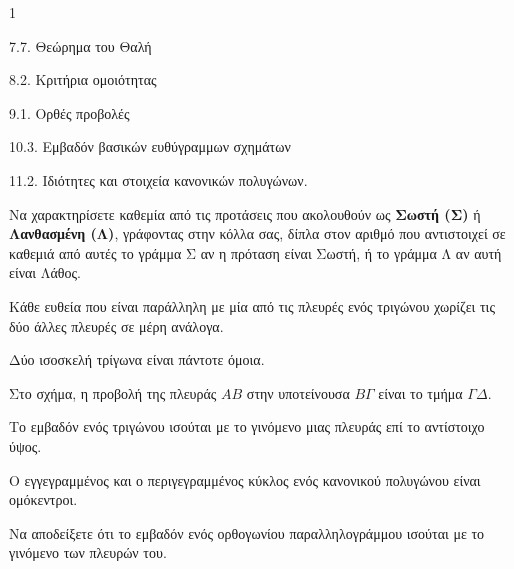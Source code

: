\begin{ylh}{1}
    \item 7.7. Θεώρημα του Θαλή
    \item 8.2. Κριτήρια ομοιότητας
    \item 9.1. Ορθές προβολές
    \item 10.3. Εμβαδόν βασικών ευθύγραμμων σχημάτων
    \item 11.2. Ιδιότητες και στοιχεία κανονικών πολυγώνων.
\end{ylh}
\begin{figure}
\end{figure}
\begin{alist}
    \item Να χαρακτηρίσετε καθεμία από τις προτάσεις που ακολουθούν ως \textbf{Σωστή (Σ)} ή \textbf{Λανθασμένη (Λ)}, γράφοντας στην κόλλα σας, δίπλα στον αριθμό που αντιστοιχεί σε καθεμιά από αυτές το γράμμα Σ αν η πρόταση είναι Σωστή, ή το γράμμα Λ αν αυτή είναι Λάθος.
    \begin{rlist}
        \item Κάθε ευθεία που είναι παράλληλη με μία από τις πλευρές ενός τριγώνου χωρίζει τις δύο άλλες πλευρές σε μέρη ανάλογα.
        \item Δύο ισοσκελή τρίγωνα είναι πάντοτε όμοια.
        \item Στο σχήμα, η προβολή της πλευράς $AB$ στην υποτείνουσα $B\Gamma$ είναι το τμήμα $\Gamma\Delta$.
        \item Το εμβαδόν ενός τριγώνου ισούται με το γινόμενο μιας πλευράς επί το αντίστοιχο ύψος.
        \item Ο εγγεγραμμένος και ο περιγεγραμμένος κύκλος ενός κανονικού πολυγώνου είναι ομόκεντροι.
    \end{rlist} 
    \item Να αποδείξετε ότι το εμβαδόν ενός ορθογωνίου παραλληλογράμμου ισούται με το γινόμενο των πλευρών του. 
\end{alist}